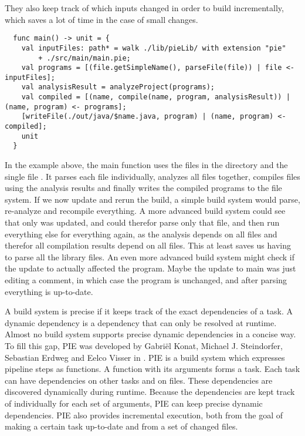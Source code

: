 They also keep track of which inputs changed in order to build incrementally, which saves a lot of time in the case of small changes.
\begin{lstlisting}
  func main() -> unit = {
    val inputFiles: path* = walk ./lib/pieLib/ with extension "pie"
        + ./src/main/main.pie;
    val programs = [(file.getSimpleName(), parseFile(file)) | file <- inputFiles];
    val analysisResult = analyzeProject(programs);
    val compiled = [(name, compile(name, program, analysisResult)) | (name, program) <- programs];
    [writeFile(./out/java/$name.java, program) | (name, program) <- compiled];
    unit
  }
\end{lstlisting}
In the example above, the main function uses the files in the directory  and the single file .
It parses each file individually, analyzes all files together, compiles files using the analysis results and finally writes the compiled programs to the file system.
If we now update  and rerun the build, a simple build system would parse, re-analyze and recompile everything.
A more advanced build system could see that only  was updated, and could therefor parse only that file, and then run everything else for everything again, as the analysis depends on all files and therefor all compilation results depend on all files.
This at least saves us having to parse all the library files.
An even more advanced build system might check if the update to  actually affected the program.
Maybe the update to main was just editing a comment, in which case the program is unchanged, and after parsing  everything is up-to-date.

A build system is precise if it keeps track of the exact dependencies of a task.
A dynamic dependency is a dependency that can only be resolved at runtime.
Almost no build system supports precise dynamic dependencies in a concise way.
To fill this gap, \ac{PIE} was developed by Gabriël Konat, Michael J. Steindorfer, Sebastian Erdweg and Eelco Visser in \autocite{KonatSEV19}.
\Ac{PIE} is a build system which expresses pipeline steps as functions.
A function with its arguments forms a task.
Each task can have dependencies on other tasks and on files.
These dependencies are discovered dynamically during runtime.
Because the dependencies are kept track of individually for each set of arguments, \ac{PIE} can keep precise dynamic dependencies.
\Ac{PIE} also provides incremental execution, both from the goal of making a certain task up-to-date and from a set of changed files.

